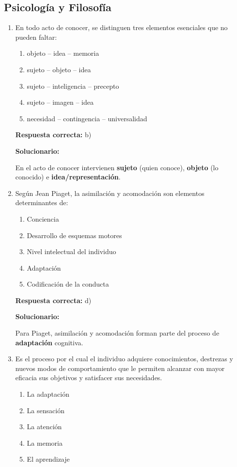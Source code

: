 \subsection*{Psicología y Filosofía}

\begin{enumerate}[resume]
	
	\item  En todo acto de conocer, se distinguen tres elementos esenciales que no pueden faltar:
	\begin{enumerate}[label=\alph*)]
		\item objeto -- idea -- memoria
		\item sujeto -- objeto -- idea
		\item sujeto -- inteligencia -- precepto
		\item sujeto -- imagen -- idea
		\item necesidad -- contingencia -- universalidad
	\end{enumerate}
	
	\textbf{Respuesta correcta:} b)
	
	\vspace{2mm}
	\textbf{Solucionario:}
	
	En el acto de conocer intervienen \textbf{sujeto} (quien conoce), \textbf{objeto} (lo conocido) e \textbf{idea/representación}.
	
	\item  Según Jean Piaget, la asimilación y acomodación son elementos determinantes de:
	\begin{enumerate}[label=\alph*)]
		\item Conciencia
		\item Desarrollo de esquemas motores
		\item Nivel intelectual del individuo
		\item Adaptación
		\item Codificación de la conducta
	\end{enumerate}
	
	\textbf{Respuesta correcta:} d)
	
	\vspace{2mm}
	\textbf{Solucionario:}
	
	Para Piaget, asimilación y acomodación forman parte del proceso de \textbf{adaptación} cognitiva.
	
	\item  Es el proceso por el cual el individuo adquiere conocimientos, destrezas y nuevos modos de comportamiento que le permiten alcanzar con mayor eficacia sus objetivos y satisfacer sus necesidades.
	\begin{enumerate}[label=\alph*)]
		\item La adaptación
		\item La sensación
		\item La atención
		\item La memoria
		\item El aprendizaje
	\end{enumerate}
	

\end{enumerate}
